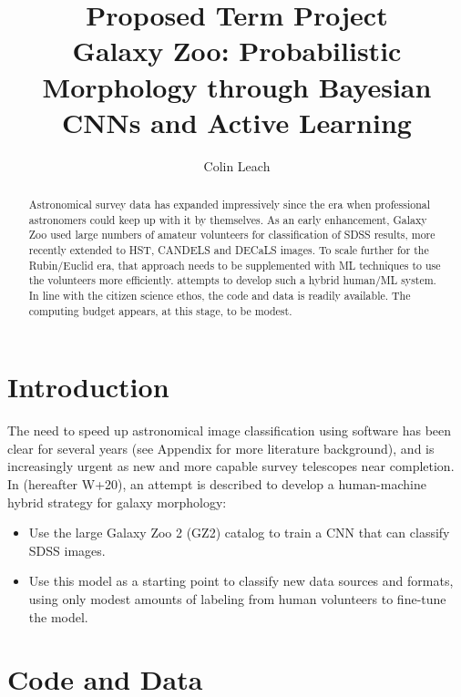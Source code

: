 \documentclass[twocolumn, twocolappendix, tighten]{aastex63}
\begin{document}
\title{Proposed Term Project \\Galaxy Zoo: Probabilistic Morphology through Bayesian CNNs and Active Learning}


%
\author[0000-0003-3608-1546]{Colin Leach}

\begin{abstract}

Astronomical survey data has expanded impressively since the era when professional astronomers could keep up with it by themselves. As an early enhancement, Galaxy Zoo used large numbers of amateur volunteers for classification of SDSS results, more recently extended to HST, CANDELS and DECaLS images. To scale further for the Rubin/Euclid era, that approach needs to be supplemented with ML techniques to use the volunteers more efficiently. \citet{walmsley_galaxy_2020} attempts to develop such a hybrid human/ML system. In line with the citizen science ethos, the code and data is readily available. The computing budget appears, at this stage, to be modest.\\

\end{abstract} 

\section{Introduction} \label{sec:intro}

The need to speed up astronomical image classification using software has been clear for several years  (see Appendix for more literature background), and is increasingly urgent as new and more capable survey telescopes near completion. In \citet{walmsley_galaxy_2020} (hereafter W+20), an attempt is described to develop a human-machine hybrid strategy for galaxy morphology:
\begin{itemize}
	\item Use the large Galaxy Zoo 2 (GZ2) catalog to train a CNN that can classify SDSS images.
	\item Use this model as a starting point to classify new data sources and formats, using only modest amounts of labeling from human volunteers to fine-tune the model.
\end{itemize}


\section{Code and Data} \label{sec:avail}
\end{document}
